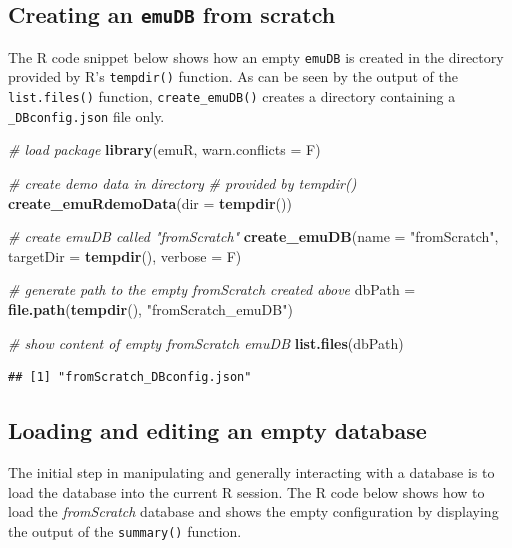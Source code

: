 \documentclass[]{book}
\newenvironment{Shaded}{\begin{snugshade}}{\end{snugshade}}
\newcommand{\CommentTok}[1]{\textcolor[rgb]{0.56,0.35,0.01}{\textit{#1}}}
\newcommand{\DataTypeTok}[1]{\textcolor[rgb]{0.13,0.29,0.53}{#1}}
\newcommand{\KeywordTok}[1]{\textcolor[rgb]{0.13,0.29,0.53}{\textbf{#1}}}
\newcommand{\NormalTok}[1]{#1}
\newcommand{\StringTok}[1]{\textcolor[rgb]{0.31,0.60,0.02}{#1}}
\theoremstyle{definition}
\theoremstyle{definition}
\theoremstyle{definition}
\theoremstyle{remark}
\begin{document}
\hypertarget{creating-an-emudb-from-scratch}{%
\subsection{\texorpdfstring{Creating an \texttt{emuDB} from
scratch}{Creating an emuDB from scratch}}\label{creating-an-emudb-from-scratch}}

The R code snippet below shows how an empty \texttt{emuDB} is created in
the directory provided by R's \texttt{tempdir()} function. As can be
seen by the output of the \texttt{list.files()} function,
\texttt{create\_emuDB()} creates a directory containing a
\texttt{\_DBconfig.json} file only.

\begin{Shaded}
\begin{Highlighting}[]
\CommentTok{# load package}
\KeywordTok{library}\NormalTok{(emuR, }\DataTypeTok{warn.conflicts =}\NormalTok{ F)}

\CommentTok{# create demo data in directory }
\CommentTok{# provided by tempdir()}
\KeywordTok{create_emuRdemoData}\NormalTok{(}\DataTypeTok{dir =} \KeywordTok{tempdir}\NormalTok{())}

\CommentTok{# create emuDB called "fromScratch"}
\KeywordTok{create_emuDB}\NormalTok{(}\DataTypeTok{name =} \StringTok{"fromScratch"}\NormalTok{,}
             \DataTypeTok{targetDir =} \KeywordTok{tempdir}\NormalTok{(),}
             \DataTypeTok{verbose =}\NormalTok{ F)}

\CommentTok{# generate path to the empty fromScratch created above}
\NormalTok{dbPath =}\StringTok{ }\KeywordTok{file.path}\NormalTok{(}\KeywordTok{tempdir}\NormalTok{(), }\StringTok{"fromScratch_emuDB"}\NormalTok{)}

\CommentTok{# show content of empty fromScratch emuDB}
\KeywordTok{list.files}\NormalTok{(dbPath)}
\end{Highlighting}
\end{Shaded}

\begin{verbatim}
## [1] "fromScratch_DBconfig.json"
\end{verbatim}

\hypertarget{loading-and-editing-an-empty-database}{%
\subsection{Loading and editing an empty
database}\label{loading-and-editing-an-empty-database}}

The initial step in manipulating and generally interacting with a
database is to load the database into the current R session. The R code
below shows how to load the \emph{fromScratch} database and shows the
empty configuration by displaying the output of the \texttt{summary()}
function.
\end{document}
